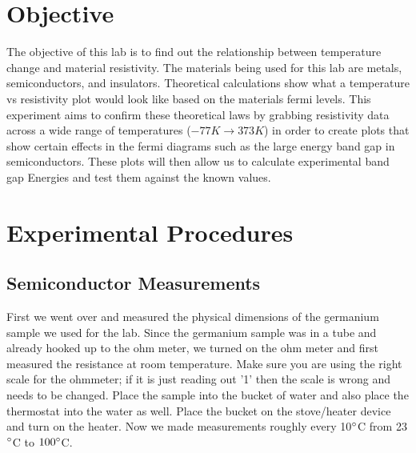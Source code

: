 \documentclass{article}
\begin{document}



\section{Objective}

The objective of this lab is to find out the relationship between temperature change and material resistivity. The materials being used for this lab are metals, semiconductors, and insulators. Theoretical calculations show what a temperature vs resistivity plot would look like based on the materials fermi levels. This experiment aims to confirm these theoretical laws by grabbing resistivity data across a wide range of temperatures ($-77K\rightarrow 373K$) in order to create plots that show certain effects in the fermi diagrams such as the large energy band gap in semiconductors. These plots will then allow us to calculate experimental band gap Energies and test them against the known values.
\section{Experimental Procedures}
\subsection{Semiconductor Measurements}
First we went over and measured the physical dimensions of the germanium sample we used for the lab. Since the germanium sample was in a tube and already hooked up to the ohm meter, we turned on the ohm meter and first measured the resistance at room temperature. Make sure you are using the right scale for the ohmmeter; if it is just reading out '1' then the scale is wrong and needs to be changed. Place the sample into the bucket of water and also place the thermostat into the water as well. Place the bucket on the stove/heater device and turn on the heater. Now we made measurements roughly every 10$\degree$C from 23$\degree$C to $100\degree$C.
\end{document}
